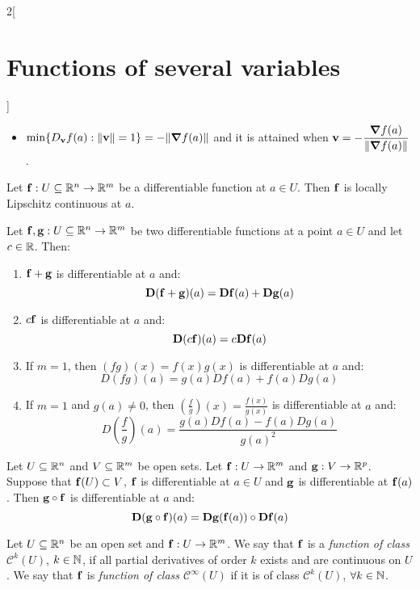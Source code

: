 \documentclass[../../../main.tex]{subfiles}
\begin{document}
\begin{multicols}{2}[\section{Functions of several variables}]
\begin{prop}
\begin{itemize}
      \item $\displaystyle\min\{D_{\boldsymbol{\mathrm{v}}}f(a):\|\boldsymbol{\mathrm{v}}\|=1\}=-\|\grad f(a)\|$ and it is attained when $\displaystyle \boldsymbol{\mathrm{v}}=-\frac{\grad f(a)}{\|\grad f(a)\|}$.
    \end{itemize}
  \end{prop}
  \begin{theorem}
    Let $\boldsymbol{\mathrm{f}}:U\subseteq\mathbb{R}^n\rightarrow\mathbb{R}^m$ be a differentiable function at $a\in U$. Then $\boldsymbol{\mathrm{f}}$ is locally Lipschitz continuous at $a$.
  \end{theorem}
  \begin{theorem}
    Let $\boldsymbol{\mathrm{f}},\boldsymbol{\mathrm{g}}:U\subseteq\mathbb{R}^n\to\mathbb{R}^m$ be two differentiable functions at a point $a\in U$ and let $c\in\mathbb{R} $. Then:
    \begin{enumerate}
      \item $\boldsymbol{\mathrm{f}}+\boldsymbol{\mathrm{g}}$ is differentiable at $a$ and: $$\boldsymbol{\mathrm{D}}(\boldsymbol{\mathrm{f}}+\boldsymbol{\mathrm{g}})(a)=\boldsymbol{\mathrm{Df}}(a)+\boldsymbol{\mathrm{Dg}}(a)$$
      \item $c\boldsymbol{\mathrm{f}}$ is differentiable at $a$ and:
            $$\boldsymbol{\mathrm{D}}(c\boldsymbol{\mathrm{f}})(a)=c\boldsymbol{\mathrm{Df}}(a)$$
      \item If $m=1$, then $(fg)(x)=f(x)g(x)$ is differentiable at $a$ and: $$D(fg)(a)=g(a)Df(a)+f(a)Dg(a)$$
      \item If $m=1$ and $g(a)\ne0$, then $\displaystyle\left(\frac{f}{g}\right)(x)=\frac{f(x)}{g(x)}$ is differentiable at $a$ and: $$D\left(\frac{f}{g}\right)(a)=\frac{g(a)Df(a)-f(a)Dg(a)}{{g(a)}^2}$$
    \end{enumerate}
  \end{theorem}
  \begin{theorem}
    Let $U\subseteq\mathbb{R}^n$ and $V\subseteq\mathbb{R}^m$ be open sets. Let $\boldsymbol{\mathrm{f}}:U\rightarrow\mathbb{R}^m$ and $\boldsymbol{\mathrm{g}}:V\rightarrow\mathbb{R}^p$. Suppose that $\boldsymbol{\mathrm{f}}(U)\subset V$, $\boldsymbol{\mathrm{f}}$ is differentiable at $a\in U$ and $\boldsymbol{\mathrm{g}}$ is differentiable at $\boldsymbol{\mathrm{f}}(a)$. Then $\boldsymbol{\mathrm{g}}\circ \boldsymbol{\mathrm{f}}$ is differentiable at $a$ and: $$\boldsymbol{\mathrm{D}}(\boldsymbol{\mathrm{g}}\circ \boldsymbol{\mathrm{f}})(a)=\boldsymbol{\mathrm{Dg}}(\boldsymbol{\mathrm{f}}(a))\circ \boldsymbol{\mathrm{Df}}(a)$$
  \end{theorem}
  \begin{definition}
    Let $U\subseteq\mathbb{R}^n$ be an open set and $\boldsymbol{\mathrm{f}}:U\rightarrow\mathbb{R}^m$. We say that $\boldsymbol{\mathrm{f}}$ is a \textit{function of class $\mathcal{C}^k(U)$}, $k\in\mathbb{N} $, if all partial derivatives of order $k$ exists and are continuous on $U$. We say that $\boldsymbol{\mathrm{f}}$ is \textit{function of class $\mathcal{C}^\infty(U)$} if it is of class $\mathcal{C}^k(U)$, $\forall k\in\mathbb{N} $.
  \end{definition}
  \begin{theorem}

\end{theorem}
\end{multicols}
\end{document}

